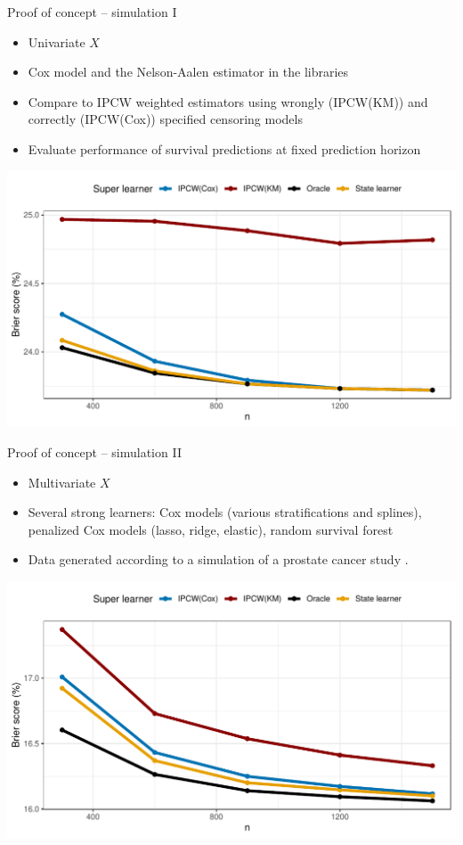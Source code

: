 \documentclass[smaller]{beamer}\usepackage{listings}
\begin{document}
\begin{frame}[label={sec:orgab42a79}]{Proof of concept -- simulation I}
\small

\begin{itemize}
\item Univariate \(X\)
\item Cox model and the Nelson-Aalen estimator in the libraries
\item Compare to IPCW weighted estimators using wrongly (IPCW(KM)) and correctly
(IPCW(Cox)) specified censoring models
\item Evaluate performance of survival predictions at fixed prediction horizon
\end{itemize}

\begin{center}
\includegraphics[width=.9\textwidth]{./ipcw-fail.pdf}
\end{center}
\end{frame}

\begin{frame}[label={sec:org486e421}]{Proof of concept -- simulation II}
\small

\begin{itemize}
\item Multivariate \(X\)
\item Several strong learners: Cox models (various stratifications and splines),
penalized Cox models (lasso, ridge, elastic), random survival forest
\item Data generated according to a simulation of a prostate cancer study
\citep{kattan2000pretreatment,gerds2013estimating}.
\end{itemize}

\begin{center}
\includegraphics[width=.9\textwidth]{./zelefski-sim.pdf}
\end{center}
\end{frame}
\end{document}
